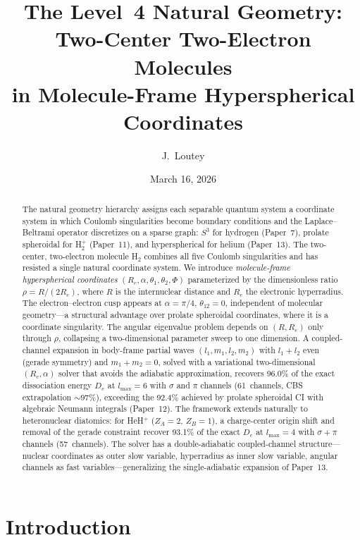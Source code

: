 \documentclass[aps,pra,twocolumn,superscriptaddress,longbibliography]{revtex4-2}
\title{The Level~4 Natural Geometry:\\
Two-Center Two-Electron Molecules\\
in Molecule-Frame Hyperspherical Coordinates}
\author{J.~Loutey}
\affiliation{Independent Researcher, Kent, Washington}
\date{March 16, 2026}
\begin{document}
\begin{abstract}
The natural geometry hierarchy assigns each separable quantum system
a coordinate system in which Coulomb singularities become boundary
conditions and the Laplace--Beltrami operator discretizes on a sparse graph:
$S^3$ for hydrogen (Paper~7), prolate spheroidal for H$_2^+$ (Paper~11),
and hyperspherical for helium (Paper~13).
The two-center, two-electron molecule H$_2$ combines all five Coulomb
singularities and has resisted a single natural coordinate system.
We introduce \emph{molecule-frame hyperspherical coordinates}
$(R_e,\alpha,\theta_1,\theta_2,\Phi)$ parameterized by the
dimensionless ratio $\rho = R/(2R_e)$, where $R$ is the internuclear
distance and $R_e$ the electronic hyperradius.
The electron--electron cusp appears at $\alpha=\pi/4$, $\theta_{12}=0$,
independent of molecular geometry---a structural advantage over
prolate spheroidal coordinates, where it is a coordinate singularity.
The angular eigenvalue problem depends on $(R,R_e)$ only through $\rho$,
collapsing a two-dimensional parameter sweep to one dimension.
A coupled-channel expansion in body-frame partial waves
$(l_1,m_1,l_2,m_2)$ with $l_1+l_2$ even (gerade symmetry) and
$m_1+m_2=0$, solved with a variational two-dimensional
$(R_e,\alpha)$ solver that avoids the adiabatic approximation,
recovers 96.0\% of the exact dissociation energy $D_e$ at
$l_{\max}=6$ with $\sigma$ and $\pi$ channels (61~channels,
CBS extrapolation ${\sim}97\%$),
exceeding the 92.4\% achieved by prolate spheroidal CI with algebraic
Neumann integrals (Paper~12).
The framework extends naturally to heteronuclear diatomics: for
HeH$^+$ ($Z_A=2$, $Z_B=1$), a charge-center origin shift and removal
of the gerade constraint recover 93.1\% of the exact $D_e$ at
$l_{\max}=4$ with $\sigma{+}\pi$ channels (57~channels).
The solver has a double-adiabatic coupled-channel structure---nuclear
coordinates as outer slow variable, hyperradius as inner slow variable,
angular channels as fast variables---generalizing the single-adiabatic
expansion of Paper~13.
\end{abstract}

\maketitle

\section{Introduction}
\label{sec:intro}
\end{document}
